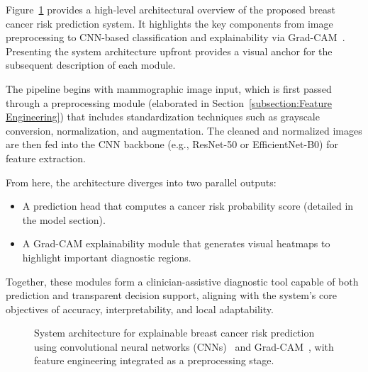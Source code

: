 \documentclass[12pt]{article}
\begin{document}
Figure~\ref{fig:system_architecture} provides a high-level architectural overview of the proposed breast cancer risk prediction system. It highlights the key components from image preprocessing to CNN-based classification and explainability via Grad-CAM~\cite{1,5}. Presenting the system architecture upfront provides a visual anchor for the subsequent description of each module.

The pipeline begins with mammographic image input, which is first passed through a preprocessing module (elaborated in Section~\ref{subsection:Feature Engineering}) that includes standardization techniques such as grayscale conversion, normalization, and augmentation. The cleaned and normalized images are then fed into the CNN backbone (e.g., ResNet-50 or EfficientNet-B0) for feature extraction.

From here, the architecture diverges into two parallel outputs:
\begin{itemize}
    \item A prediction head that computes a cancer risk probability score (detailed in the model section).
    \item A Grad-CAM explainability module that generates visual heatmaps to highlight important diagnostic regions.
\end{itemize}

Together, these modules form a clinician-assistive diagnostic tool capable of both prediction and transparent decision support, aligning with the system’s core objectives of accuracy, interpretability, and local adaptability.

\begin{figure}[H]
    \centering
    \caption{System architecture for explainable breast cancer risk prediction using convolutional neural networks (CNNs)~\cite{1} and Grad-CAM~\cite{5}, with feature engineering integrated as a preprocessing stage.}
    \label{fig:system_architecture}
\end{figure}
\end{document}
